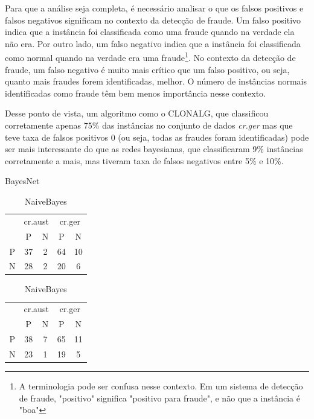 Para que a análise seja completa, é necessário analisar o que os falsos positivos e falsos negativos significam no contexto da detecção de fraude. Um falso positivo indica que a instância foi classificada como uma fraude quando na verdade ela não era. Por outro lado, um falso negativo indica que a instância foi classificada como normal quando na verdade era uma fraude\footnote{A terminologia pode ser confusa nesse contexto. Em um sistema de detecção de fraude, "positivo" significa "positivo para fraude", e não que a instância é "boa"}. No contexto da detecção de fraude, um falso negativo é muito mais crítico que um falso positivo, ou seja, quanto mais fraudes forem identificadas, melhor. O número de instâncias normais identificadas como fraude têm bem menos importância nesse contexto.

Desse ponto de vista, um algoritmo como o CLONALG, que classificou corretamente apenas 75\% das instâncias no conjunto de dados \emph{cr.ger} mas que teve taxa de falsos positivos 0 (ou seja, todas as fraudes foram identificadas) pode ser mais interessante do que as redes bayesianas, que classificaram 9\% instâncias corretamente a mais, mas tiveram taxa de falsos negativos entre 5\% e 10\%.

\begin{table}[p]
    \parbox{.45\linewidth}{
        \centering
        \caption{BayesNet}
        \begin{tabular}{c|c c|c c}
            \multicolumn{1}{c}{}  & \multicolumn{2}{c}{cr.aust} & \multicolumn{2}{c}{cr.ger} \\
            \multirow{1}{2.5mm}{} & P & N & P & N \\
            \hline
            P & 37 & 2 & 64 & 10 \\
            N & 28 & 2 & 20 &  6 \\
        \end{tabular}
    }
    \hfill
    \parbox{.45\linewidth}{
        \centering
        \caption{NaiveBayes}
        \begin{tabular}{c|c c|c c}
            \multicolumn{1}{c}{}  & \multicolumn{2}{c}{cr.aust} & \multicolumn{2}{c}{cr.ger} \\
            \multirow{1}{2.5mm}{} & P & N & P & N \\
            \hline
            P & 38 & 7 & 65 & 11 \\
            N & 23 & 1 & 19 &  5 \\
        \end{tabular}
    }
\end{table}

